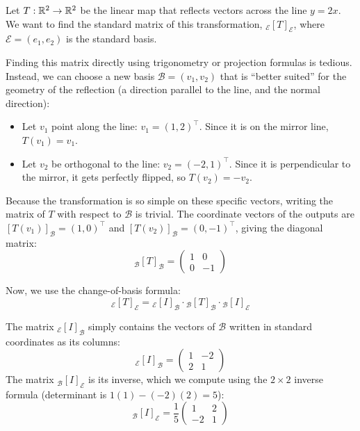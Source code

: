 \documentclass[../linear_algebra_and_groups.tex]{subfiles}
\begin{document}
\begin{example}
    Let $T:\mathbb{R}^2\to\mathbb{R}^2$ be the linear map that reflects vectors across the line $y=2x$. We want to find the standard matrix of this transformation, ${}_\mathcal{E}[T]_\mathcal{E}$, where $\mathcal{E} = (e_1, e_2)$ is the standard basis.\par
    Finding this matrix directly using trigonometry or projection formulas is tedious. Instead, we can choose a new basis $\mathcal{B} = (v_1, v_2)$ that is ``better suited'' for the geometry of the reflection (a direction parallel to the line, and the normal direction):
    \begin{itemize}
        \item Let $v_1$ point along the line: $v_1 = (1, 2)^\top$. Since it is on the mirror line, $T(v_1) = v_1$.
        \item Let $v_2$ be orthogonal to the line: $v_2 = (-2, 1)^\top$. Since it is perpendicular to the mirror, it gets perfectly flipped, so $T(v_2) = -v_2$.
    \end{itemize}
    
    Because the transformation is so simple on these specific vectors, writing the matrix of $T$ with respect to $\mathcal{B}$ is trivial. The coordinate vectors of the outputs are $[T(v_1)]_\mathcal{B} = (1, 0)^\top$ and $[T(v_2)]_\mathcal{B} = (0, -1)^\top$, giving the diagonal matrix:
    \[ {}_\mathcal{B}[T]_\mathcal{B} = \begin{pmatrix} 1 & 0 \\ 0 & -1 \end{pmatrix} \]
    
    Now, we use the change-of-basis formula: 
    \[ {}_\mathcal{E}[T]_\mathcal{E} = {}_\mathcal{E}[I]_\mathcal{B} \cdot {}_\mathcal{B}[T]_\mathcal{B} \cdot {}_\mathcal{B}[I]_\mathcal{E} \]
    
    The matrix ${}_\mathcal{E}[I]_\mathcal{B}$ simply contains the vectors of $\mathcal{B}$ written in standard coordinates as its columns:
    \[ {}_\mathcal{E}[I]_\mathcal{B} = \begin{pmatrix} 1 & -2 \\ 2 & 1 \end{pmatrix} \]
    The matrix ${}_\mathcal{B}[I]_\mathcal{E}$ is its inverse, which we compute using the $2\times2$ inverse formula (determinant is $1(1) - (-2)(2) = 5$):
    \[ {}_\mathcal{B}[I]_\mathcal{E} = \frac{1}{5} \begin{pmatrix} 1 & 2 \\ -2 & 1 \end{pmatrix} \]
    

\end{example}
\end{document}

